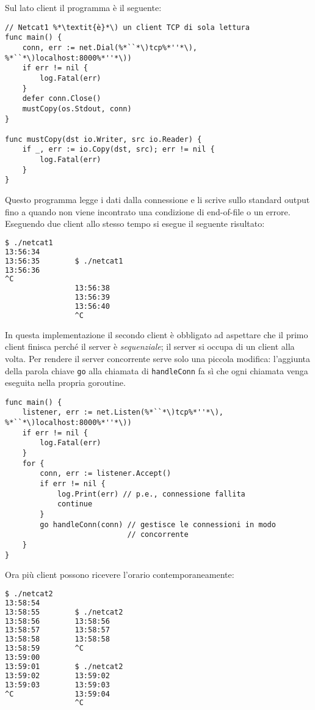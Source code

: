 Sul lato client il programma è il seguente:
\begin{lstlisting}[frame=single, label={lst:lstlisting7-2.2}]
// Netcat1 %*\textit{è}*\) un client TCP di sola lettura
func main() {
    conn, err := net.Dial(%*``*\)tcp%*''*\), %*``*\)localhost:8000%*''*\))
    if err != nil {
        log.Fatal(err)
    }
    defer conn.Close()
    mustCopy(os.Stdout, conn)
}

func mustCopy(dst io.Writer, src io.Reader) {
    if _, err := io.Copy(dst, src); err != nil {
        log.Fatal(err)
    }
}
\end{lstlisting}
Questo programma legge i dati dalla connessione e li scrive sullo standard output fino a quando non viene incontrato una condizione di end-of-file o un errore.
Eseguendo due client allo stesso tempo si esegue il seguente risultato:
\begin{lstlisting}[language=bash, frame=L, label={lst:lstlisting7-2.3}]
$ ./netcat1
13:56:34
13:56:35        $ ./netcat1
13:56:36
^C
                13:56:38
                13:56:39
                13:56:40
                ^C
\end{lstlisting}
In questa implementazione il secondo client è obbligato ad aspettare che il primo client finisca perché il server è \textit{sequenziale};
il server si occupa di un client alla volta.
Per rendere il server concorrente serve solo una piccola modifica: l'aggiunta della parola chiave \verb|go| alla chiamata di \verb|handleConn| fa sì che ogni chiamata venga eseguita nella propria goroutine.
\begin{lstlisting}[frame=single, label={lst:lstlisting7-2.4}]
func main() {
    listener, err := net.Listen(%*``*\)tcp%*''*\), %*``*\)localhost:8000%*''*\))
    if err != nil {
        log.Fatal(err)
    }
    for {
        conn, err := listener.Accept()
        if err != nil {
            log.Print(err) // p.e., connessione fallita
            continue
        }
        go handleConn(conn) // gestisce le connessioni in modo
                            // concorrente
    }
}
\end{lstlisting}
Ora più client possono ricevere l'orario contemporaneamente:
\begin{lstlisting}[language=bash, frame=L, label={lst:lstlisting7-2.5}]
$ ./netcat2
13:58:54
13:58:55        $ ./netcat2
13:58:56        13:58:56
13:58:57        13:58:57
13:58:58        13:58:58
13:58:59        ^C
13:59:00
13:59:01        $ ./netcat2
13:59:02        13:59:02
13:59:03        13:59:03
^C              13:59:04
                ^C
\end{lstlisting}